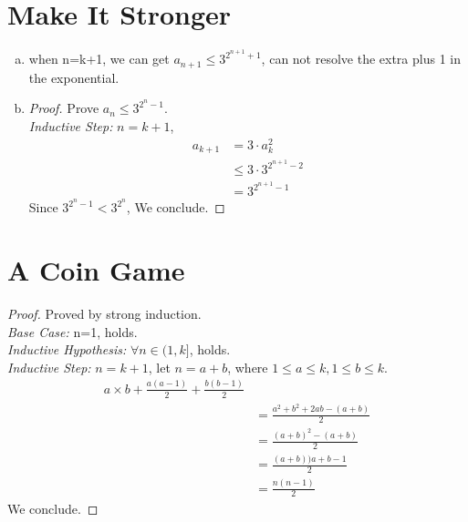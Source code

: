 \documentclass{article}
\begin{document}
    \part*{Make It Stronger}
    \begin{enumerate}[(a).]
        \item when n=k+1, we can get $a_{n+1} \le 3^{2^{n+1}+1}$, can not resolve the extra plus 1 in the exponential.
        
        \item \begin{proof}
            Prove $a_n \le 3^{2^{n}-1}$.\\
            \emph{Inductive Step: }$n=k+1$,\\
            \begin{align*}
                a_{k+1} &= 3\cdot a_k^2\\
                &\le 3 \cdot 3^{2^{n+1}-2}\\
                &= 3^{2^{n+1}-1}
            \end{align*}
            Since $3^{2^{n}-1} < 3^{2^{n}}$, We conclude.
        \end{proof}
    \end{enumerate}

    \part*{A Coin Game}
    \begin{proof}
        Proved by strong induction.\\
        \emph{Base Case: }n=1, holds.\\
        \emph{Inductive Hypothesis: }$\forall n \in (1, k]$, holds.\\
        \emph{Inductive Step: }
        $n=k+1$, let $n=a+b$, where $1 \le a \le k, 1 \le b \le k$.\\
        \begin{align*}
            a \times b+\frac{a(a-1)}{2}+\frac{b(b-1)}{2}\\
            &=\frac{a^2+b^2+2ab-(a+b)}{2}\\
            &=\frac{(a+b)^2-(a+b)}{2}\\
            &=\frac{(a+b))a+b-1}{2}\\
            &=\frac{n(n-1)}{2}
        \end{align*}
        We conclude.
    \end{proof}
\end{document}
